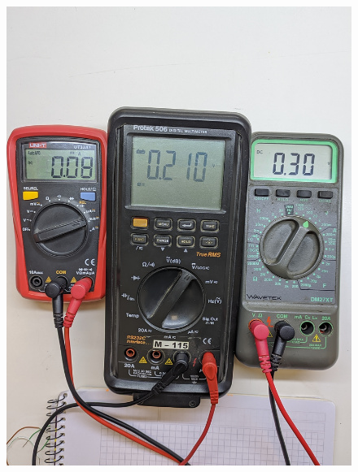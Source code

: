 \documentclass[chaptersright]{informeutn}
\begin{document}
\begin{figure}[!ht]
\begin{minipage}{0.25\textwidth}
          \includegraphics[width=1\textwidth]{pictures/mult_crkt-2_05.jpg}
        \end{minipage}
        \begin{minipage}{0.25\textwidth}

\end{minipage}
\end{figure}
\end{document}
